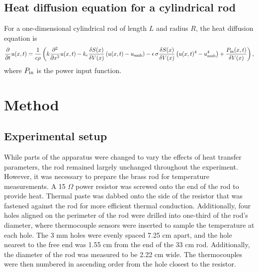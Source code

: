 \documentclass[letterpaper,titlepage,oneside]{report}
\begin{document}
\section{Heat diffusion equation for a cylindrical rod}
For a one-dimensional cylindrical rod of length $L$ and radius
$R$, the heat diffusion equation is 
\begin{equation}\label{eq:heatdiffrod}
  \frac{\partial}{\partial t}u(x,t) =
  \frac{1}{c\rho}\left(
  k\frac{\partial^2}{\partial x^2}u(x, t)
  -k_c\frac{\delta S(x)}{\delta V(x)}
  \left(u(x,t)-u_{\rm{amb}}\right) 
  -\epsilon\,\sigma\frac{\delta S(x)}{\delta V(x)}
  \left(u(x,t)^4-u_{\rm{amb}}^4\right)
  +\frac{P_{\rm{in}}(x,t)}{\delta V(x)}
  \right),
\end{equation}
where $P_{\rm{in}}$ is the power input function.

\chapter{Method}
\label{ch:method}

\section{Experimental setup}
While parts of the apparatus were changed to vary the effects of
heat transfer parameters, the rod remained largely unchanged
throughout the experiment. However, it was necessary to prepare
the brass rod for temperature measurements. A 15 $\Omega$ power
resistor was screwed onto the end of the rod to provide heat.
Thermal paste was dabbed onto the side of the resistor that was
fastened against the rod for more efficient thermal conduction.
Additionally, four holes aligned on the perimeter of the rod were
drilled into one-third of the rod's diameter, where thermocouple
sensors were inserted to sample the temperature at each hole.
The 3 mm holes were evenly spaced 7.25 cm apart, and the hole
nearest to the free end was 1.55 cm from the end of the 33 cm rod.
Additionally, the diameter of the rod was measured to be 2.22 cm
wide. The thermocouples were then numbered in ascending order from
the hole closest to the resistor.
\\

\end{document}
